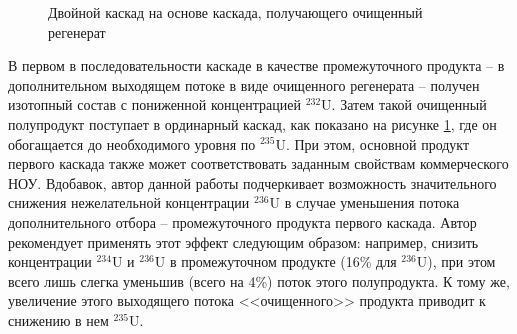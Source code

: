 \begin{figure}[ht]
  \caption{Двойной каскад на основе каскада, получающего очищенный регенерат}\label{fig:int_double}
\end{figure}

В первом в последовательности каскаде в качестве промежуточного продукта -- в дополнительном выходящем потоке в виде очищенного регенерата -- получен изотопный состав с пониженной концентрацией $^{232}$U.
Затем такой очищенный полупродукт поступает в ординарный каскад, как показано на рисунке \ref{fig:int_double}, где он обогащается до необходимого уровня по $^{235}$U.
При этом, основной продукт первого каскада также может соответствовать заданным свойствам коммерческого НОУ.
Вдобавок, автор данной работы подчеркивает возможность значительного снижения нежелательной концентрации $^{236}$U в случае уменьшения потока дополнительного отбора -- промежуточного продукта первого каскада.
Автор рекомендует применять этот эффект следующим образом: например, снизить концентрации  $^{234}$U и  $^{236}$U в промежуточном продукте (16\% для  $^{236}$U), при этом всего лишь слегка уменьшив (всего на 4\%) поток этого полупродукта.
К тому же, увеличение этого выходящего потока <<очищенного>> продукта приводит к снижению в нем $^{235}$U.

